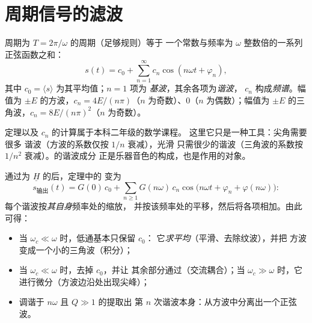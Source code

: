\section{周期信号的滤波}

\begin{theorem}[傅里叶分解]\label{thm:b1:filters-transfer-functions:fourier}
周期为 $T = 2\pi/\omega$ 的周期（足够规则）等于
一个常数与频率为 $\omega$ 整数倍的一系列正弦函数之和：
\[
s(t) = c_0 + \sum_{n = 1}^{\infty} c_n\cos(n\omega t + \varphi_n),
\]
其中 $c_0 = \langle s\rangle$ 为其平均值；$n = 1$ 项为
\emph{基波}，其余各项为\emph{谐波}，
 $c_n$ 构成\emph{频谱}。幅值为
$\pm E$ 的方波，$c_n = 4E/(n\pi)$（$n$ 为奇数）、$0$（$n$ 为偶数）；幅值为
$\pm E$ 的三角波，$c_n = 8E/(n\pi)^2$（$n$ 为奇数）。
\end{theorem}
\admitted

\begin{remark}[要点]\label{rem:b1:filters-transfer-functions:fourier}
定理以及 $c_n$ 的计算属于本科二年级的数学课程。
这里它只是一种工具：尖角需要很多
谐波（方波的系数仅按 $1/n$ 衰减），光滑
只需很少的谐波（三角波的系数按 $1/n^2$ 衰减）。的谐波成分
正是乐器音色的构成，也是作用的对象。
\end{remark}

\begin{proposition}[周期信号的线性滤波]\label{prop:b1:filters-transfer-functions:filtering}
通过为 $\underline H$ 的后，定理中的
变为
\[
s_{\text{输出}}(t) = G(0)\,c_0 + \sum_{n \geq 1} G(n\omega)\,c_n\cos\!\big(n\omega t + \varphi_n + \varphi(n\omega)\big):
\]
每个谐波按\emph{其自身}频率处的缩放，
并按该频率处的平移，然后将各项相加。由此可得：
\begin{itemize}
  \item 当 $\omega_c \ll \omega$ 时，低通基本只保留 $c_0$：
        它\emph{求平均}（平滑、去除纹波），并把
        方波变成一个小的三角波（积分）；
  \item 当 $\omega_c \ll \omega$ 时，去掉 $c_0$，并让
        其余部分通过（交流耦合）；当 $\omega_c \gg \omega$ 时，它
        进行微分（方波边沿处出现尖峰）；
  \item 调谐于 $n\omega$ 且 $Q \gg 1$ 的提取出
        第 $n$ 次谐波本身：从方波中分离出一个正弦波。
\end{itemize}
\end{proposition}

